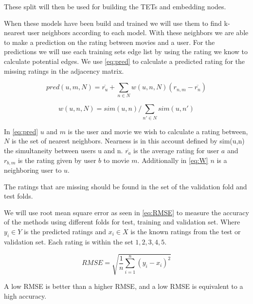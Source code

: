 These split will then be used for building the TETs and embedding nodes.

When these models have been build and trained we will use them to find k-nearest user neighbors according to each model.
With these neighbors we are able to make a prediction on the rating between movies and a user.
For the predictions we will use each training sets edge list by using the rating we know to calculate potential edges. 
We use \autoref{eq:pred} to calculate a predicted rating for the missing ratings in the adjacency matrix.

\begin{equation}\label{eq:pred}
pred(u,m,N) = \overline{r_u}+\sum_{n \in N}w(u,n, N)(r_{n,m}-\overline{r_n})
\end{equation}

\begin{equation}\label{eq:W}
w(u,n, N)=sim(u,n)/\sum_{n' \in N} sim(u,n')
\end{equation}

In \autoref{eq:pred} $u$ and $m$ is the user and movie we wish to calculate a rating between, $N$ is the set of nearest neighbors.
Nearness is in this account defined by sim(u,n) the simultaneity between users u and n.
$\overline{r_a}$ is the average rating for user $a$ and $r_{b,m}$ is the rating given by user $b$ to movie $m$.
Additionally in \autoref{eq:W} $n$ is a neighboring user to $u$.

The ratings that are missing should be found in the set of the validation fold and test folds.

We will use root mean square error as seen in  \autoref{eq:RMSE}\cite{chai2014root} to measure the accuracy of the methods using different folds for test, training and validation set.
Where $y_i \in Y$ is the predicted ratings and $x_i \in X$ is the known ratings from the test or validation set. Each rating is within the set ${1,2,3,4,5}$.

\begin{equation}\label{eq:RMSE}
RMSE = \sqrt{\frac{1}{n}\sum^n_{i=1}(y_i - x_i)^2}
\end{equation}

A low RMSE is better than a higher RMSE, and a low RMSE is equivalent to a high accuracy.

